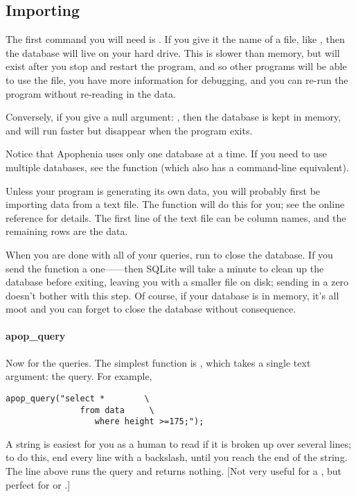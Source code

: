 \subsection{Importing}
The first command you will need is . If you give
it the name of a file, like , then the
database will live on your hard drive. This is slower than memory, but
will exist after you stop and restart the program, and so other programs
will be able to use the file, you have more information for debugging,
and you can re-run the program without re-reading in the data.

Conversely, if you give a null argument: ,
then the database is kept in memory, and will run faster but 
disappear when the program exits.

Notice that Apophenia uses only one database at a time. If you need to
use multiple databases, see the  function (which
also has a command-line equivalent).

Unless your program is generating its own data, you will probably
first be importing data from a text file.  The 
function will do this for you; see the online reference for details. The
first line of the text file can be column names, and the remaining rows
are the data. 

When you are done with all of your queries, run
 to close the database. If you send the function a
one------then SQLite will take a minute to clean
up the database before exiting, leaving you with a smaller file on disk;
sending in a zero doesn't bother with this step. Of course, if your
database is in memory, it's all moot and you can forget to close the
database without consequence.


\paragraph{apop\_query} Now for the queries. The simplest function
is , which takes a single text argument: the
query. For example,
\setc
\begin{lstlisting}
apop_query("select *        \
               from data     \
                  where height >=175;");
\end{lstlisting}

A string is easiest for you as a human to read if it is
broken up over several lines; to do this, end every line with a
backslash, until you reach the end of the string. The line above runs
the query and returns nothing. [Not very useful for a , but perfect for
\sinline{create} or \sinline{insert}.]

